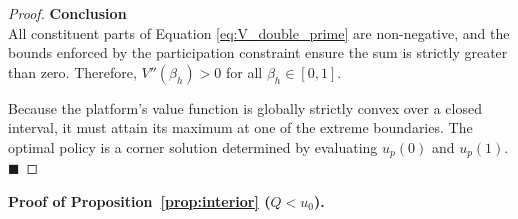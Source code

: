 \documentclass[mnsc,nonblindrev]{informs3_NoOR}
\begin{document}
\begin{proof}
\vspace{0.5em}
\noindent\textbf{Conclusion} \\
All constituent parts of Equation \eqref{eq:V_double_prime} are non-negative, and the bounds enforced by the participation constraint ensure the sum is strictly greater than zero. Therefore, $V''(\beta_h) > 0$ for all $\beta_h \in [0,1]$. 

Because the platform's value function is globally strictly convex over a closed interval, it must attain its maximum at one of the extreme boundaries. The optimal policy is a corner solution determined by evaluating $u_p(0)$ and $u_p(1)$. \hfill $\blacksquare$
\end{proof}
\bigskip






\noindent\textbf{Proof of Proposition~\ref{prop:interior} ($Q < u_0$).}
\end{document}
